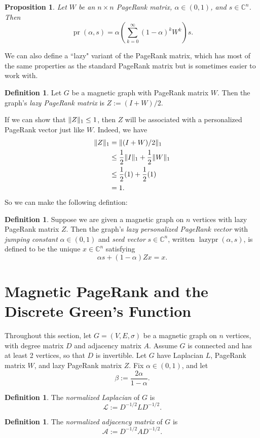 \documentclass[12pt]{article}
\newtheorem{prop}[thm]{Proposition}
\theoremstyle{definition}
\newtheorem{defn}[thm]{Definition}
\newcommand{\C}{\mathbb C}
\DeclarePairedDelimiter\norm{\lVert}{\rVert}
\DeclareMathOperator{\pr}{pr}
\DeclareMathOperator{\lazypr}{lazypr}
\newcommand{\lap}{\mathcal{L}}
\newcommand{\normadj}{\mathcal{A}}
\begin{document}
\begin{prop}
Let $W$ be an $n \times n$ PageRank matrix, $\alpha \in (0, 1)$, and $s \in \C^n$. Then $$\pr(\alpha, s) = \alpha \left( \sum_{k=0}^{\infty} (1 - \alpha)^k W^k \right) s.$$
\end{prop}

We can also define a ``lazy" variant of the PageRank matrix, which has most of the same properties as the standard PageRank matrix but is sometimes easier to work with.

\begin{defn}
Let $G$ be a magnetic graph with PageRank matrix $W$. Then the graph's \textit{lazy PageRank matrix} is $Z := (I + W)/2$.
\end{defn}

If we can show that $\norm{Z}_1 \leq 1$, then $Z$ will be associated with a personalized PageRank vector just like $W$. Indeed, we have
\begin{align*}
\norm{Z}_1 &= \norm{(I+W)/2}_1 \\
&\leq \frac{1}{2} \norm{I}_1 + \frac{1}{2} \norm{W}_1 \\
&\leq \frac{1}{2} (1) + \frac{1}{2} (1) \\
&= 1.
\end{align*}
So we can make the following defintion:

\begin{defn}
Suppose we are given a magnetic graph on $n$ vertices with lazy PageRank matrix $Z$. Then the graph's \textit{lazy personalized PageRank vector} with \textit{jumping constant} $\alpha \in (0, 1)$ and \textit{seed vector} $s \in \C^n$, written $\lazypr (\alpha, s)$, is defined to be the unique $x \in \C^n$ satisfying
$$
\alpha s + (1 - \alpha) Z x = x.
$$
\end{defn}

\pagebreak

\section{Magnetic PageRank and the Discrete Green's Function}

Throughout this section, let $G=(V, E, \sigma)$ be a magnetic graph on $n$ vertices, with degree matrix $D$ and adjacency matrix $A$. Assume $G$ is connected and has at least 2 vertices, so that $D$ is invertible. Let $G$ have Laplacian $L$, PageRank matrix $W$, and lazy PageRank matrix $Z$. Fix $\alpha \in (0, 1)$, and let $$\beta := \frac{2 \alpha}{1 - \alpha}.$$
\begin{defn} 
The \textit{normalized Laplacian} of $G$ is
$$
\lap := D^{-1/2} L D^{-1/2}. 
$$
\end{defn}
\begin{defn}
The \textit{normalized adjacency matrix} of $G$ is
$$
\normadj := D^{-1/2} A D^{-1/2}. 
$$
\end{defn}
\end{document}
